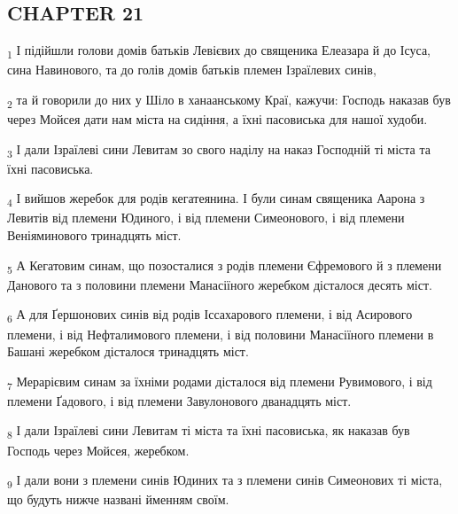 \subsection{CHAPTER 21}
\begin{tcolorbox}
\textsubscript{1} І підійшли голови домів батьків Левієвих до священика Елеазара й до Ісуса, сина Навинового, та до голів домів батьків племен Ізраїлевих синів,
\end{tcolorbox}
\begin{tcolorbox}
\textsubscript{2} та й говорили до них у Шіло в ханаанському Краї, кажучи: Господь наказав був через Мойсея дати нам міста на сидіння, а їхні пасовиська для нашої худоби.
\end{tcolorbox}
\begin{tcolorbox}
\textsubscript{3} І дали Ізраїлеві сини Левитам зо свого наділу на наказ Господній ті міста та їхні пасовиська.
\end{tcolorbox}
\begin{tcolorbox}
\textsubscript{4} І вийшов жеребок для родів кегатеянина. І були синам священика Аарона з Левитів від племени Юдиного, і від племени Симеонового, і від племени Веніяминового тринадцять міст.
\end{tcolorbox}
\begin{tcolorbox}
\textsubscript{5} А Кегатовим синам, що позосталися з родів племени Єфремового й з племени Данового та з половини племени Манасіїного жеребком дісталося десять міст.
\end{tcolorbox}
\begin{tcolorbox}
\textsubscript{6} А для Ґершонових синів від родів Іссахарового племени, і від Асирового племени, і від Нефталимового племени, і від половини Манасіїного племени в Башані жеребком дісталося тринадцять міст.
\end{tcolorbox}
\begin{tcolorbox}
\textsubscript{7} Мерарієвим синам за їхніми родами дісталося від племени Рувимового, і від племени Ґадового, і від племени Завулонового дванадцять міст.
\end{tcolorbox}
\begin{tcolorbox}
\textsubscript{8} І дали Ізраїлеві сини Левитам ті міста та їхні пасовиська, як наказав був Господь через Мойсея, жеребком.
\end{tcolorbox}
\begin{tcolorbox}
\textsubscript{9} І дали вони з племени синів Юдиних та з племени синів Симеонових ті міста, що будуть нижче названі йменням своїм.
\end{tcolorbox}
